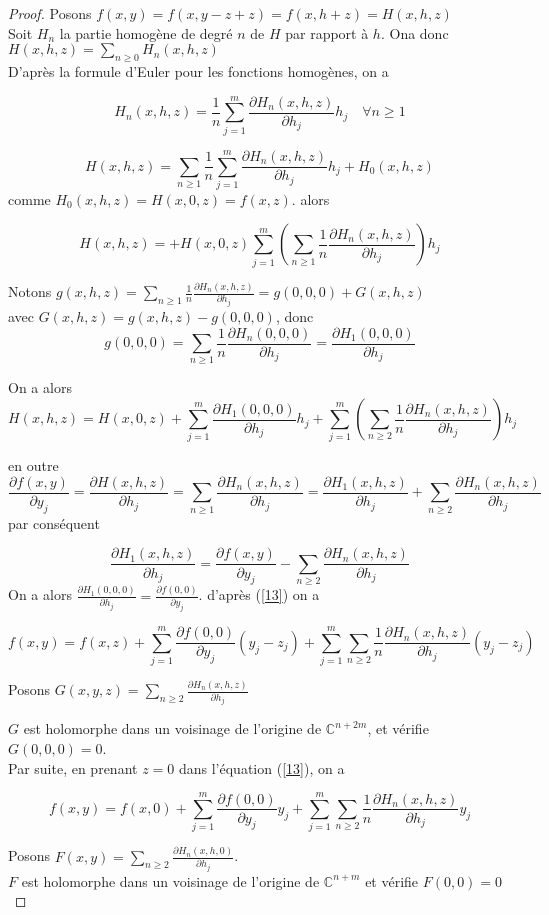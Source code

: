 \documentclass[12pt,a4paper]{report}
\theoremstyle{plain}
\theoremstyle{definition}
\theoremstyle{remark}
\newcommand{\Cnm}{\ensuremath{\mathbb{C}^{n+m}}}
\newcommand{\Cnmm}{\ensuremath{\mathbb{C}^{n+2m}}}
\begin{document}
\begin{proof}
Posons $f(x,y)=f(x,y-z+z)=f(x,h+z)=H(x,h,z)$\\
Soit $H_n$ la partie homogène de degré $n$ de $H$ par rapport à $h$. Ona donc\\
 $H(x,h,z)=\sum_{n\geq0} H_n(x,h,z)$\\
D'après la formule d'Euler pour les fonctions homogènes, on a 

$$H_n(x,h,z)=\frac{1}{n} \sum_{j=1}^m \frac{\partial H_n(x,h,z)}{\partial h_j}h_j \quad \forall n\geq 1$$

$$H(x,h,z)=\sum_{n\geq 1} \frac{1}{n} \sum_{j=1}^m \frac{\partial H_n(x,h,z)}{\partial h_j}h_j +H_0(x,h,z)$$
 comme $ H_0(x,h,z)=H(x,0,z) = f(x,z)$. alors 
 
 $$H(x,h,z)= +H(x,0,z)  \sum_{j=1}^m (\sum_{n\geq 1} \frac{1}{n}  \frac{\partial H_n(x,h,z)}{\partial h_j})h_j $$
 
 Notons  $g(x,h,z)=\sum_{n\geq 1} \frac{1}{n}  \frac{\partial H_n(x,h,z)}{\partial h_j}=g(0,0,0)+G(x,h,z)$\\
 avec $G(x,h,z)=g(x,h,z)-g(0,0,0)$, donc 
 $$g(0,0,0)= \sum_{n\geq 1} \frac{1}{n}  \frac{\partial H_n(0,0,0)}{\partial h_j}=\frac{\partial H_1(0,0,0)}{\partial h_j}$$
 
 On a alors 
 \begin{equation}\label{13}
 H(x,h,z)=H(x,0,z)+\sum_{j=1}^m \frac{\partial H_1(0,0,0)}{\partial h_j}h_j + \sum_{j=1}^m(\sum_{n\geq 2} \frac{1}{n} \frac{\partial H_n(x,h,z)}{\partial h_j})h_j
 \end{equation}
 
 en outre 
 $$\frac{\partial f(x,y)}{\partial y_j}= \frac{\partial H(x,h,z)}{\partial h_j}= \sum_{n\geq 1} \frac{\partial H_n(x,h,z)}{\partial h_j}=\frac{\partial H_1(x,h,z)}{\partial h_j} + \sum_{n\geq 2} \frac{\partial H_n(x,h,z)}{\partial h_j}$$
 par conséquent 
 
 $$ \frac{\partial H_1(x,h,z)}{\partial h_j}= \frac{\partial f(x,y)}{\partial y_j} - \sum_{n\geq 2} \frac{\partial H_n(x,h,z)}{\partial h_j}$$
  On a alors $\frac{\partial H_1(0,0,0)}{\partial h_j}= \frac{\partial f(0,0)}{\partial y_j}$. d'après (\ref{13}) on a 
  
  $$ f(x,y)=f(x,z)+\sum_{j=1}^m \frac{\partial f(0,0)}{\partial y_j}(y_j-z_j)    + \sum_{j=1}^m \sum_{n\geq 2 } \frac{1}{n} \frac{\partial H_n (x,h,z)}{\partial h_j}(y_j-z_j)   $$
 
 Posons $ G(x,y,z)= \sum_{n\geq 2 }  \frac{\partial H_n (x,h,z)}{\partial h_j}$
 
 $G$ est holomorphe dans un voisinage de l'origine de $\Cnmm$, et vérifie $G(0,0,0)=0$.\\Par suite, en prenant $z=0$ dans l'équation (\ref{13}), on a 
 
 $$ f(x,y)=f(x,0)+\sum_{j=1}^m \frac{\partial f(0,0)}{\partial y_j}y_j   + \sum_{j=1}^m \sum_{n\geq 2 } \frac{1}{n} \frac{\partial H_n (x,h,z)}{\partial h_j}y_j   $$
 
 Posons $F(x,y)= \sum_{n\geq 2 } \frac{\partial H_n (x,h,0)}{\partial h_j}$.\\
 $F$ est holomorphe dans un voisinage de l'origine  de $\Cnm$ et vérifie $F(0,0)=0$
\end{proof}
\end{document}
